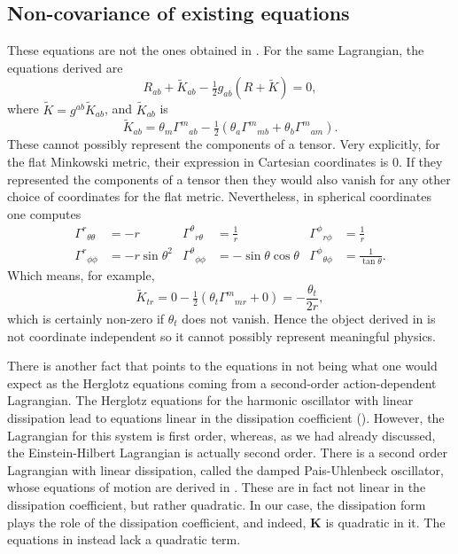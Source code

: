 \documentclass[../main.tex]{subfiles}
\begin{document}
\subsection{Non-covariance of existing equations}
These equations are not the ones obtained in \cite{Lazo2017}. For the same Lagrangian, the
equations derived are
\begin{equation} \label{eq:EFE lazo}
	R_{ab} + \tilde{K}_{ab} - \tfrac{1}{2}g_{ab}(R + \tilde{K}) = 0,
\end{equation}
where $\tilde{K}=g^{ab}\tilde{K}_{ab}$, and $\tilde{K}_{ab}$ is 
\begin{equation} \label{eq:}
	\tilde{K}_{ab} = \theta_m {\Gamma^m}_{ab} - \tfrac{1}{2}\left(\theta_a {\Gamma^m}_{mb} +
	\theta_b {\Gamma^m}_{am}\right). 
\end{equation}
These cannot possibly represent the components of a tensor. Very explicitly,  for the flat Minkowski metric, their
expression in Cartesian coordinates is 0. If they represented the components of a tensor then they would also vanish for any other choice of coordinates for the flat metric. Nevertheless, in spherical coordinates one computes
\begin{align*}
	{\Gamma^r}_{\theta\theta} & = -r & {\Gamma^\theta}_{r\theta} & = \frac{1}{r} &
	{\Gamma^\phi}_{r\phi} & = \frac{1}{r} \\
	{\Gamma^r}_{\phi\phi} & = -r \sin{\theta}^2 & {\Gamma^\theta}_{\phi\phi} & =
	-\sin{\theta}\cos{\theta} & {\Gamma^\phi}_{\theta\phi} & = \frac{1}{\tan{\theta}}. 
\end{align*}
Which means, for example,
\begin{equation*}
	\tilde{K}_{tr} = 0 - \tfrac{1}{2}(\theta_t {\Gamma^m}_{mr} + 0) =
	-\frac{\theta_t}{2r},
\end{equation*}
which is certainly non-zero if \( \theta_t \) does not vanish. Hence the object derived in \cite{Lazo2017} is not coordinate independent so it
cannot possibly represent meaningful physics. 

There is another fact that points to the equations in \cite{Lazo2017} not being what one would expect as the Herglotz equations coming from a second-order action-dependent Lagrangian. The Herglotz equations for the harmonic oscillator with
linear dissipation lead to equations linear in the dissipation coefficient (\cite{Gaset2020b}). However, the Lagrangian for this system is first
order, whereas, as we had already discussed, the Einstein-Hilbert Lagrangian is actually
second order. There is a second order Lagrangian with linear
dissipation, called the damped Pais-Uhlenbeck oscillator, whose equations of motion are derived in \cite{Leon2021a}. These are in fact not linear in the dissipation coefficient, but rather quadratic. In
our case, the dissipation form plays the role of the dissipation coefficient, and indeed, \(\mathbf{K}\) is quadratic in it. The equations in \cite{Lazo2017} instead lack a quadratic term.
\end{document}

